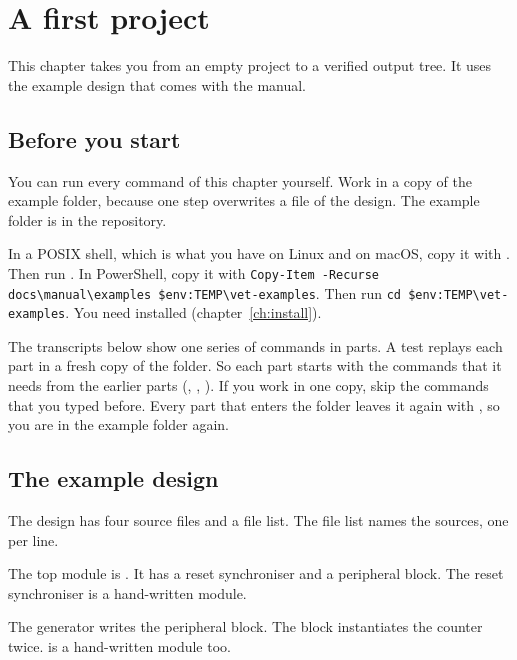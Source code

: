 \chapter{A first project}
\label{ch:first}

This chapter takes you from an empty project to a verified output tree. It uses
the example design that comes with the manual.

\section{Before you start}

You can run every command of this chapter yourself. Work in a copy of the example
folder, because one step overwrites a file of the design. The example folder is
 in the repository.

In a POSIX shell, which is what you have on Linux and on macOS, copy it with
. Then run .
In PowerShell, copy it with \texttt{Copy-Item -Recurse docs\textbackslash manual\textbackslash examples
\$env:TEMP\textbackslash vet-examples}. Then run \texttt{cd \$env:TEMP\textbackslash vet-examples}.
You need  installed (chapter~\ref{ch:install}).

The transcripts below show one series of commands in parts. A test
replays each part in a fresh copy of the folder. So each part starts with the commands
that it needs from the earlier parts (, , ).
If you work in one copy, skip the commands that you typed before. Every part that
enters the folder  leaves it again with , so you are in the
example folder again.

\section{The example design}

The design has four source files and a file list. The file list names the
sources, one per line.



The top module is . It has a reset synchroniser and a peripheral
block. The reset synchroniser is a hand-written module.



The generator writes the peripheral block. The block instantiates the counter
 twice.  is a hand-written module too.

